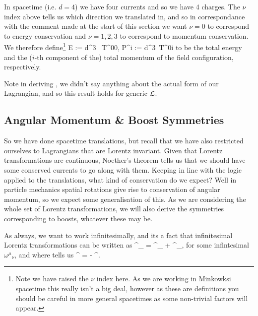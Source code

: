 In spacetime (i.e. $d=4$) we have four currents and so we have 4 charges. The $\nu$ index above tells us which direction we translated in, and so in correspondance with the comment made at the start of this section we want $\nu=0$ to correspond to energy conservation and $\nu=1,2,3$ to correspond to momentum conservation. We therefore define\footnote{Note we have raised the $\nu$ index here. As we are working in Minkowksi spacetime this really isn't a big deal, however as these are definitions you should be careful in more general spacetimes as some non-trivial factors will appear.}
\be 
\label{eqn:EnergyAndMomentumCharges}
    E := \int d^3 \, T^{00}, \qand P^i := \int d^3\, T^{0i}
\ee 
to be the total energy and the ($i$-th component of the) total momentum of the field configuration, respectively. 

\br 
    Note in deriving , we didn't say anything about the actual form of our Lagrangian, and so this result holds for generic $\mathcal{L}$.
\er 

\subsection{Angular Momentum \& Boost Symmetries}

So we have done spacetime translations, but recall that we have also restricted ourselves to Lagrangians that are Lorentz invariant. Given that Lorentz transformations are continuous, Noether's theorem tells us that we should have some conserved currents to go along with them. Keeping in line with the logic applied to the translations, what kind of conservation do we expect? Well in particle mechanics spatial rotations give rise to conservation of angular momentum, so we expect some generalisation of this. As we are considering the whole set of Lorentz transformations, we will also derive the symmetries corresponding to boosts, whatever these may be. 

As always, we want to work infinitesimally, and its a fact that infinitesimal Lorentz transformations can be written as
\be 
\label{eqn:InfinitesimallyLorentz}
    {\Lambda^{\mu}}_{\nu} = {\del^{\mu}}_{\nu} + {\omega^{\mu}}_{\nu},
\ee 
for some infintesimal ${\omega^{\mu}}_{\nu}$, and where  tells us 
\be 
\label{eqn:AntisymmetricOmega}
    \omega^{\mu\nu} = - \omega^{\nu\mu}.
\ee 

